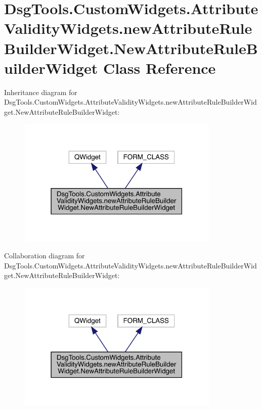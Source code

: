 \hypertarget{class_dsg_tools_1_1_custom_widgets_1_1_attribute_validity_widgets_1_1new_attribute_rule_builder_3a2b8c8cd1a59db9d7af938ad35eab8c}{}\section{Dsg\+Tools.\+Custom\+Widgets.\+Attribute\+Validity\+Widgets.\+new\+Attribute\+Rule\+Builder\+Widget.\+New\+Attribute\+Rule\+Builder\+Widget Class Reference}
\label{class_dsg_tools_1_1_custom_widgets_1_1_attribute_validity_widgets_1_1new_attribute_rule_builder_3a2b8c8cd1a59db9d7af938ad35eab8c}


Inheritance diagram for Dsg\+Tools.\+Custom\+Widgets.\+Attribute\+Validity\+Widgets.\+new\+Attribute\+Rule\+Builder\+Widget.\+New\+Attribute\+Rule\+Builder\+Widget\+:
\nopagebreak
\begin{figure}[H]
\begin{center}
\leavevmode
\includegraphics[width=274pt]{class_dsg_tools_1_1_custom_widgets_1_1_attribute_validity_widgets_1_1new_attribute_rule_builder_2947f419fff4ff08c18677434ecada54}
\end{center}
\end{figure}


Collaboration diagram for Dsg\+Tools.\+Custom\+Widgets.\+Attribute\+Validity\+Widgets.\+new\+Attribute\+Rule\+Builder\+Widget.\+New\+Attribute\+Rule\+Builder\+Widget\+:
\nopagebreak
\begin{figure}[H]
\begin{center}
\leavevmode
\includegraphics[width=274pt]{class_dsg_tools_1_1_custom_widgets_1_1_attribute_validity_widgets_1_1new_attribute_rule_builder_a5fc9a695b4f1d0d7d8357b7809854c0}
\end{center}
\end{figure}

